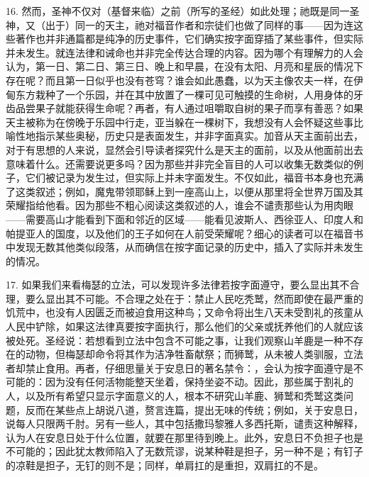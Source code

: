 16. 然而，圣神不仅对（基督来临）之前（所写的圣经）如此处理；祂既是同一圣神，又（出于）同一的天主，祂对福音作者和宗徒们也做了同样的事——因为连这些著作也并非通篇都是纯净的历史事件，它们确实按字面穿插了某些事件，但实际并未发生。就连法律和诫命也并非完全传达合理的内容。因为哪个有理解力的人会认为，第一日、第二日、第三日、晚上和早晨，在没有太阳、月亮和星辰的情况下存在呢？而且第一日似乎也没有苍穹？谁会如此愚蠢，以为天主像农夫一样，在伊甸东方栽种了一个乐园，并在其中放置了一棵可见可触摸的生命树，人用身体的牙齿品尝果子就能获得生命呢？再者，有人通过咀嚼取自树的果子而享有善恶？如果天主被称为在傍晚于乐园中行走，亚当躲在一棵树下，我想没有人会怀疑这些事比喻性地指示某些奥秘，历史只是表面发生，并非字面真实。加音从天主面前出去，对于有思想的人来说，显然会引导读者探究什么是天主的面前，以及从他面前出去意味着什么。还需要说更多吗？因为那些并非完全盲目的人可以收集无数类似的例子，它们被记录为发生过，但实际上并未字面发生。不仅如此，福音书本身也充满了这类叙述；例如，魔鬼带领耶稣上到一座高山上，以便从那里将全世界万国及其荣耀指给他看。因为那些不粗心阅读这类叙述的人，谁会不谴责那些认为用肉眼——需要高山才能看到下面和邻近的区域——能看见波斯人、西徐亚人、印度人和帕提亚人的国度，以及他们的王子如何在人前受荣耀呢？细心的读者可以在福音书中发现无数其他类似段落，从而确信在按字面记录的历史中，插入了实际并未发生的情况。\par

17. 如果我们来看梅瑟的立法，可以发现许多法律若按字面遵守，要么显出其不合理，要么显出其不可能。不合理之处在于：禁止人民吃秃鹫，然而即使在最严重的饥荒中，也没有人因匮乏而被迫食用这种鸟；又命令将出生八天未受割礼的孩童从人民中铲除，如果这法律真要按字面执行，那么他们的父亲或抚养他们的人就应该被处死。圣经说：若想看到立法中包含不可能之事，让我们观察山羊鹿是一种不存在的动物，但梅瑟却命令将其作为洁净牲畜献祭；而狮鹫，从未被人类驯服，立法者却禁止食用。再者，仔细思量关于安息日的著名禁令：，会认为按字面遵守是不可能的：因为没有任何活物能整天坐着，保持坐姿不动。因此，那些属于割礼的人，以及所有希望只显示字面意义的人，根本不研究山羊鹿、狮鹫和秃鹫这类问题，反而在某些点上胡说八道，赘言连篇，提出无味的传统；例如，关于安息日，说每人只限两千肘。另有一些人，其中包括撒玛黎雅人多西托斯，谴责这种解释，认为人在安息日处于什么位置，就要在那里待到晚上。此外，安息日不负担子也是不可能的；因此犹太教师陷入了无数荒谬，说某种鞋是担子，另一种不是；有钉子的凉鞋是担子，无钉的则不是；同样，单肩扛的是重担，双肩扛的不是。\newline{}\par

